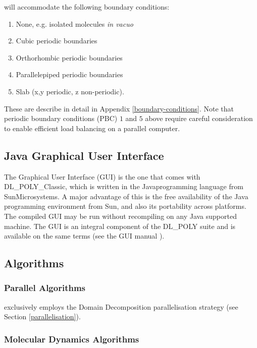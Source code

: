 \D will accommodate the following boundary conditions:
\begin{enumerate}
\item None, e.g. isolated molecules {\em in vacuo}
\item Cubic periodic boundaries
\item Orthorhombic periodic boundaries
\item Parallelepiped periodic boundaries
\item Slab (x,y periodic, z non-periodic).
\end{enumerate}

\noindent These are describe in detail in Appendix
\ref{boundary-conditions}.  Note that periodic boundary conditions
(PBC) $1$ and $5$ above require careful consideration to enable
efficient load balancing on a parallel computer.

\subsection{Java Graphical User Interface}

The \D Graphical User Interface (GUI) is the one that comes with
DL\_POLY\_Classic, which is written in the Java\textregistered programming
language from Sun\textregistered Microsystems.  A major advantage
of this is the free availability of the Java programming environment
from Sun\textregistered, and also its portability across platforms.
The compiled GUI may be run without recompiling on any Java\textregistered
supported machine.  The GUI is an integral component of the DL\_POLY
suite and is available on the same terms (see the GUI manual \cite{smith-gui}).

\subsection{Algorithms}

\subsubsection{Parallel Algorithms}

\D exclusively employs the {Domain Decomposition}
 parallelisation
strategy \cite{pinches-91a,rapaport-91b,smith-91a,smith-93a} (see
Section \ref{parallelisation}).

\subsubsection{Molecular Dynamics Algorithms}

